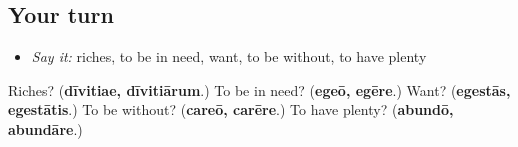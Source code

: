 \subsection*{Your turn}
\begin{itemize}
\raggedright
  \item \emph{Say it:} riches, to be in need, want, to be without, to have plenty
\end{itemize}

\begin{tcolorbox}[breakable,colback=teal!4,colframe=teal!35!black,title={Before you move on}]
Riches? (\textbf{dīvitiae, dīvitiārum}.) To be in need? (\textbf{egeō, egēre}.) Want? (\textbf{egestās, egestātis}.) To be without? (\textbf{careō, carēre}.) To have plenty? (\textbf{abundō, abundāre}.)
\end{tcolorbox}
